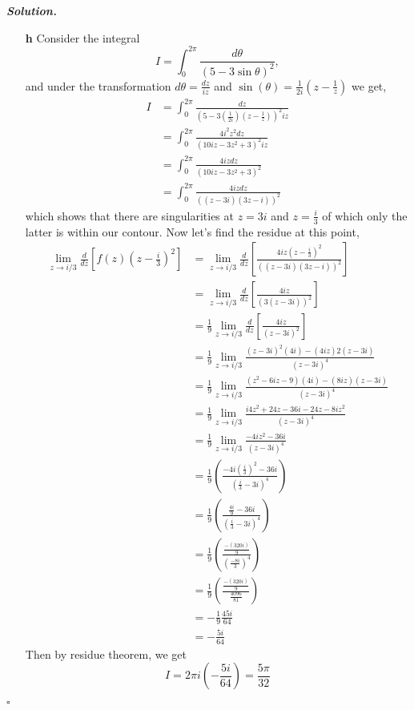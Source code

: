 \documentclass[12pt]{report}
\newenvironment{solution}[1][\it{Solution}]{\textbf{#1. } }{$\square$}
\begin{document}
\begin{solution}
\begin{enumerate}
        \item [{\bf h}]
        Consider the integral
        \[ 
            I = \int_{0}^{2\pi} \frac{d\theta}{(5-3\sin\theta)^2},
        \]
        and under the transformation $d\theta = \frac{dz}{iz}$ and $\sin(\theta) = \frac{1}{2i}(z - \frac{1}{z})$ we get,
        \begin{align*}
            I &= \int_0^{2\pi} \frac{dz}{(5 - 3(\frac{1}{2i})(z - \frac{1}{z}))^2iz}\\
            &= \int_0^{2\pi} \frac{4i^2z^2dz}{(10iz - 3z^2 + 3)^2iz}\\
            &= \int_0^{2\pi} \frac{4izdz}{(10iz - 3z^2 + 3)^2}\\
            &= \int_0^{2\pi} \frac{4izdz}{\left((z - 3i)(3z - i) \right)^2}
        \end{align*}
        which shows that there are singularities at $z = 3i$ and $z = \frac{i}{3}$ of which only the latter is within our contour. Now let's find the residue at this point,
        \begin{align*}
            \lim_{z \rightarrow i/3} \frac{d}{dz} \left[ f(z)(z - \frac{i}{3})^2\right] &= \lim_{z \rightarrow i/3} \frac{d}{dz}\left[ \frac{4iz(z - \frac{i}{3})^2}{\left((z - 3i)(3z - i) \right)^2}\right]\\
            &= \lim_{z \rightarrow i/3} \frac{d}{dz}\left[ \frac{4iz}{\left(3(z - 3i) \right)^2}\right]\\
            &= \frac{1}{9}\lim_{z \rightarrow i/3} \frac{d}{dz}\left[ \frac{4iz}{\left(z - 3i\right)^2}\right]\\
            &= \frac{1}{9}\lim_{z \rightarrow i/3} \frac{(z - 3i)^2(4i) - (4iz)2(z - 3i)}{(z - 3i)^4}\\
            &= \frac{1}{9}\lim_{z \rightarrow i/3} \frac{(z^2 - 6 i z - 9)(4i) - (8iz)(z - 3i)}{(z - 3i)^4}\\
            &= \frac{1}{9} \lim_{z \rightarrow i/3} \frac{i 4 z^2 + 24 z - 36 i - 24 z - 8 i z^2}{(z - 3i)^4}\\
            &= \frac{1}{9} \lim_{z \rightarrow i/3} \frac{-4 i z^2 - 36 i
            }{(z - 3i)^4}\\
            &= \frac{1}{9} \left( \frac{-4 i (\frac{i}{3})^2 - 36 i }{(\frac{i}{3} - 3i)^4}\right)\\
            &= \frac{1}{9} \left( \frac{\frac{4 i}{9} - 36 i }{(\frac{i}{3} - 3i)^4}\right)\\
            &= \frac{1}{9} \left( \frac{\frac{-(320 i)}{9}}{(\frac{-8i}{3})^4}\right)\\
            &= \frac{1}{9} \left( \frac{\frac{-(320 i)}{9}}{ \frac{4096}{81}} \right)\\
            &= -\frac{1}{9} \frac{45i}{64}\\
            &=  - \frac{5i}{64}
        \end{align*}
        Then by residue theorem, we get
        \[I = 2\pi i (- \frac{5i}{64}) = \frac{5\pi}{32}\]
    \end{enumerate}
\end{solution}
\end{document}
